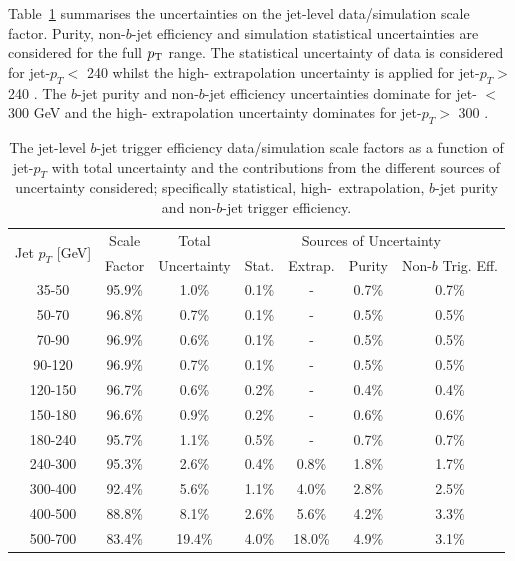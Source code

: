 Table~\ref{tab:bTrig_jetSys} summarises the uncertainties on the jet-level data/simulation scale factor.
Purity, non-$b$-jet efficiency and simulation statistical uncertainties are considered for the full $p_{\mathrm{T}}$ range.
The statistical uncertainty of data is considered for jet-$p_T <$ 240 \GeV{}
whilst the high-\pT{} extrapolation uncertainty is applied for jet-$p_T >$ 240 \GeV.
The $b$-jet purity and non-$b$-jet efficiency uncertainties dominate for jet-\pT{} $<$ 300 GeV and the high-\pT{} extrapolation uncertainty dominates for jet-$p_T >$ 300 \GeV.

\vspace{1em}
\begin{table}[!ht]
  \begin{tabular}{|c||c|c||c|c|c|c|}
    \hline
    \multirow{2}{*}{Jet $p_T$ [GeV]} & Scale  & Total       & \multicolumn{4}{c|}{Sources of Uncertainty} \\ \cline{4-7} 
                                     & Factor & Uncertainty & Stat.  & Extrap.  & Purity  & Non-$b$ Trig. Eff. \\
    \hline
    35-50   & 95.9\% & 1.0\% & 0.1\% & - & 0.7\% & 0.7\% \\
    50-70   & 96.8\% & 0.7\% & 0.1\% & - & 0.5\% & 0.5\% \\
    70-90   & 96.9\% & 0.6\% & 0.1\% & - & 0.5\% & 0.5\% \\
    90-120  & 96.9\% & 0.7\% & 0.1\% & - & 0.5\% & 0.5\% \\
    120-150 & 96.7\% & 0.6\% & 0.2\% & - & 0.4\% & 0.4\% \\
    150-180 & 96.6\% & 0.9\% & 0.2\% & - & 0.6\% & 0.6\% \\
    180-240 & 95.7\% & 1.1\% & 0.5\% & - & 0.7\% & 0.7\% \\
    \hline
    240-300 & 95.3\% & 2.6\% & 0.4\% & 0.8\% & 1.8\% & 1.7\% \\
    300-400 & 92.4\% & 5.6\% & 1.1\% & 4.0\% & 2.8\% & 2.5\% \\
    400-500 & 88.8\% & 8.1\% & 2.6\% & 5.6\% & 4.2\% & 3.3\% \\
    500-700 & 83.4\% & 19.4\% & 4.0\% & 18.0\% & 4.9\% & 3.1\% \\
    \hline
\end{tabular}
  \caption[The jet-level $b$-jet trigger efficiency data/simulation scale factors as a function of jet-$p_{T}$ with total uncertainty
    and the contributions from the different sources of uncertainty considered.]
          {The jet-level $b$-jet trigger efficiency data/simulation scale factors as a function of jet-$p_{T}$
    with total uncertainty and the contributions from the different sources of uncertainty considered;
    specifically statistical, high-\pT~extrapolation, $b$-jet purity and non-$b$-jet trigger efficiency.}
\label{tab:bTrig_jetSys}
\end{table}
\vspace{1em}


